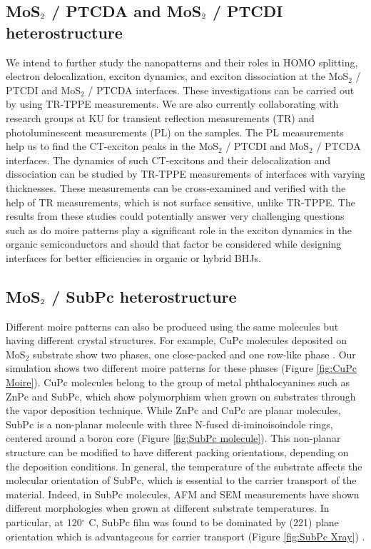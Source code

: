 \documentclass[12pt]{article}
\begin{document}
\subsection{MoS$\protect_2$ / PTCDA and MoS$\protect_2$ / PTCDI heterostructure}
 We intend to further study the nanopatterns and their roles in HOMO splitting, electron delocalization, exciton dynamics, and exciton dissociation at the MoS$_2$ / PTCDI and MoS$_2$ / PTCDA interfaces. These investigations can be carried out by using TR-TPPE measurements. We are also currently collaborating with research groups at KU for transient reflection measurements (TR) and photoluminescent measurements (PL) on the samples. The PL measurements help us to find the CT-exciton peaks in the MoS$_2$ / PTCDI and MoS$_2$ / PTCDA interfaces. The dynamics of such CT-excitons and their delocalization and dissociation can be studied by TR-TPPE measurements of interfaces with varying thicknesses. These measurements can be cross-examined and verified with the help of TR measurements, which is not surface sensitive, unlike TR-TPPE. The results from these studies could potentially answer very challenging questions such as do moire patterns play a significant role in the exciton dynamics in the organic semiconductors and should that factor be considered while designing interfaces for better efficiencies in organic or hybrid BHJs.

\subsection{MoS$\protect_2$ / SubPc heterostructure}
Different moire patterns can also be produced using the same molecules but having different crystal structures. For example, CuPc molecules deposited on MoS$_2$ substrate show two phases, one close-packed and one row-like phase \cite{ludwig1994epitaxy}. Our simulation shows two different moire patterns for these phases (Figure \ref{fig:CuPc Moire}). CuPc molecules belong to the group of metal phthalocyanines such as ZnPc and SubPc, which show polymorphism when grown on substrates through the vapor deposition technique. While ZnPc and CuPc are planar molecules, SubPc is a non-planar molecule with three N-fused di-iminoisoindole rings, centered around a boron core (Figure \ref{fig:SubPc molecule}). This non-planar structure can be modified to have different packing orientations, depending on the deposition conditions. In general, the temperature of the substrate affects the molecular orientation of SubPc, which is essential to the carrier transport of the material. Indeed, in SubPc molecules, AFM and SEM measurements have shown different morphologies when grown at different substrate temperatures. In particular, at 120$^\circ$ C, SubPc film was found to be dominated by (221) plane orientation which is advantageous for carrier transport (Figure \ref{fig:SubPc Xray}) \cite{chou2012effect}.
\end{document}
